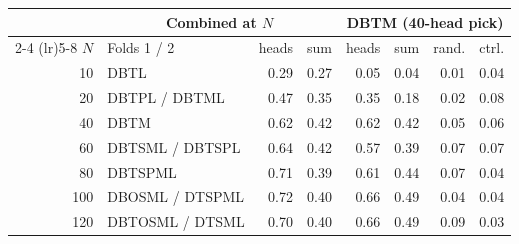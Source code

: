 \begin{tabular}{@{}rlrrrrrr@{}}
\toprule
& \multicolumn{3}{c}{Combined at $N$} & \multicolumn{4}{c}{DBTM (40-head pick)} \\
\cmidrule(lr){2-4} \cmidrule(lr){5-8}
$N$ & Folds 1 / 2 & heads & sum & heads & sum & rand. & ctrl. \\
\midrule
10 & DBTL & 0.29 & 0.27 & 0.05 & 0.04 & 0.01 & 0.04 \\
20 & DBTPL / DBTML & 0.47 & 0.35 & 0.35 & 0.18 & 0.02 & 0.08 \\
40 & DBTM & 0.62 & 0.42 & 0.62 & 0.42 & 0.05 & 0.06 \\
60 & DBTSML / DBTSPL & 0.64 & 0.42 & 0.57 & 0.39 & 0.07 & 0.07 \\
80 & DBTSPML & 0.71 & 0.39 & 0.61 & 0.44 & 0.07 & 0.04 \\
100 & DBOSML / DTSPML & 0.72 & 0.40 & 0.66 & 0.49 & 0.04 & 0.04 \\
120 & DBTOSML / DTSML & 0.70 & 0.40 & 0.66 & 0.49 & 0.09 & 0.03 \\
\bottomrule
\end{tabular}

